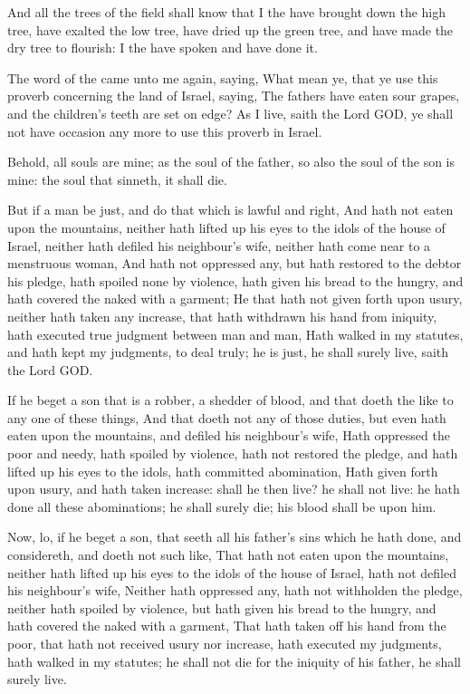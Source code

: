 \Verse And all the trees of the field shall know that I the \LORD have brought down the high tree, have exalted the low tree, have dried up the green tree, and have made the dry tree to flourish: I the \LORD have spoken and have done it.


\Chapter
\Verse The word of the \LORD came unto me again, saying, \Verse What mean ye, that ye use this proverb concerning the land of Israel, saying, The fathers have eaten sour grapes, and the children's teeth are set on edge?  \Verse As I live, saith the Lord GOD, ye shall not have occasion any more to use this proverb in Israel.

\Verse Behold, all souls are mine; as the soul of the father, so also the soul of the son is mine: the soul that sinneth, it shall die.

\Verse But if a man be just, and do that which is lawful and right, \Verse And hath not eaten upon the mountains, neither hath lifted up his eyes to the idols of the house of Israel, neither hath defiled his neighbour's wife, neither hath come near to a menstruous woman, \Verse And hath not oppressed any, but hath restored to the debtor his pledge, hath spoiled none by violence, hath given his bread to the hungry, and hath covered the naked with a garment; \Verse He that hath not given forth upon usury, neither hath taken any increase, that hath withdrawn his hand from iniquity, hath executed true judgment between man and man, \Verse Hath walked in my statutes, and hath kept my judgments, to deal truly; he is just, he shall surely live, saith the Lord GOD.

\Verse If he beget a son that is a robber, a shedder of blood, and that doeth the like to any one of these things, \Verse And that doeth not any of those duties, but even hath eaten upon the mountains, and defiled his neighbour's wife, \Verse Hath oppressed the poor and needy, hath spoiled by violence, hath not restored the pledge, and hath lifted up his eyes to the idols, hath committed abomination, \Verse Hath given forth upon usury, and hath taken increase: shall he then live? he shall not live: he hath done all these abominations; he shall surely die; his blood shall be upon him.

\Verse Now, lo, if he beget a son, that seeth all his father's sins which he hath done, and considereth, and doeth not such like, \Verse That hath not eaten upon the mountains, neither hath lifted up his eyes to the idols of the house of Israel, hath not defiled his neighbour's wife, \Verse Neither hath oppressed any, hath not withholden the pledge, neither hath spoiled by violence, but hath given his bread to the hungry, and hath covered the naked with a garment, \Verse That hath taken off his hand from the poor, that hath not received usury nor increase, hath executed my judgments, hath walked in my statutes; he shall not die for the iniquity of his father, he shall surely live.

